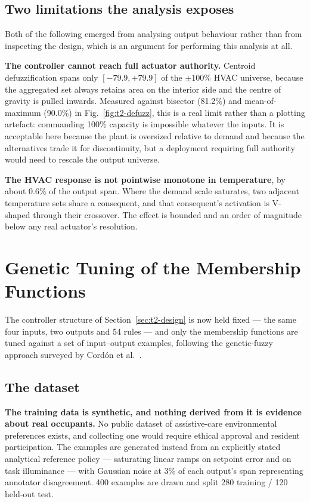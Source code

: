 \subsection{Two limitations the analysis exposes}

Both of the following emerged from analysing output behaviour rather than from
inspecting the design, which is an argument for performing this analysis at all.

\textbf{The controller cannot reach full actuator authority.} Centroid
defuzzification spans only $[-79.9, +79.9]$ of the $\pm 100\%$ HVAC universe,
because the aggregated set always retains area on the interior side and the
centre of gravity is pulled inwards. Measured against bisector (81.2\%) and
mean-of-maximum (90.0\%) in Fig.~\ref{fig:t2-defuzz}, this is a real limit
rather than a plotting artefact: commanding 100\% capacity is impossible
whatever the inputs. It is acceptable here because the plant is oversized
relative to demand and because the alternatives trade it for discontinuity, but
a deployment requiring full authority would need to rescale the output universe.

\textbf{The HVAC response is not pointwise monotone in temperature}, by about
0.6\% of the output span. Where the demand scale saturates, two adjacent
temperature sets share a consequent, and that consequent's activation is
V-shaped through their crossover. The effect is bounded and an order of
magnitude below any real actuator's resolution.

\section{Genetic Tuning of the Membership Functions}
\label{sec:t2-ga}

The controller structure of Section~\ref{sec:t2-design} is now held fixed ---
the same four inputs, two outputs and 54 rules --- and only the membership
functions are tuned against a set of input--output examples, following the
genetic-fuzzy approach surveyed by Cord\'{o}n et al.~\cite{cordon2004}.

\subsection{The dataset}

\textbf{The training data is synthetic, and nothing derived from it is evidence
about real occupants.} No public dataset of assistive-care environmental
preferences exists, and collecting one would require ethical approval and
resident participation. The examples are generated instead from an explicitly
stated analytical reference policy --- saturating linear ramps on setpoint error
and on task illuminance --- with Gaussian noise at 3\% of each output's span
representing annotator disagreement. 400 examples are drawn and split 280
training / 120 held-out test.

